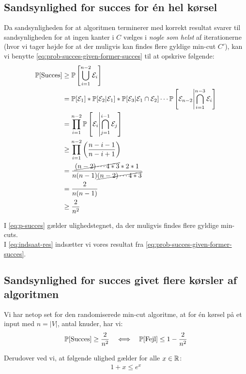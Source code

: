 \subsection{Sandsynlighed for succes for én hel kørsel}

Da sandsynligheden for at algoritmen terminerer med korrekt resultat svarer til sandsynligheden for at ingen kanter i $C$ vælges i \emph{nogle som helst} af iterationerne (hvor vi tager højde for at der muligvis kan findes flere gyldige min-cut $C'$), kan vi benytte \cref{eq:prob-succes-given-former-succes} til at opskrive følgende:
\begin{align}
    \P[\text{Succes}] &\geq \P \square{ \bigcup_{i=1}^{n-2}   \E_i} \label{eq:p-succes} \\
                      &= \P[\E_1] * \P[\E_2 | \E_1] * \P[\E_3 | \E_1 \cap \E_2] \cdots \P \square{ \E_{n-2} \middle| \bigcap_{i=1}^{n-3} \E_i } \nonumber \\
                      &= \prod_{i=1}^{n-2} \P \square{ \E_i \middle| \bigcap_{j=1}^{i-1} \E_j } \nonumber \\
                      &\geq \prod_{i=1}^{n-2} \p{ \frac{n-i-1}{n-i+1} } \label{eq:indsaat-res} \\
                      &= \frac{\cancel{(n-2) \cdots 4*3}*2*1 }{n(n-1)\cancel{(n-2) \cdots 4*3} } \nonumber \\
                      &= \frac{2}{n(n-1)} \nonumber \\
                      &\geq \frac{2}{n^2} \label{eq:final-prob-min}
\end{align}

I \cref{eq:p-succes} gælder ulighedstegnet, da der muligvis findes flere gyldige min-cuts.\\
I \cref{eq:indsaat-res} indsætter vi vores resultat fra \cref{eq:prob-succes-given-former-succes}.



\subsection{Sandsynlighed for succes givet flere kørsler af algoritmen}
Vi har netop set for den randomiserede min-cut algoritme, at for én kørsel på et input med $n = |V|$, antal knuder, har vi:
$$
\P[\text{Succes}] \geq \frac{2}{n^2} \quad \Longleftrightarrow \quad \P[\text{Fejl}] \leq 1 - \frac{2}{n^2}
$$

Derudover ved vi, at følgende ulighed gælder for alle $x \in \R$:
\begin{align} \label{eq:exp-regel}
    1 + x \leq e^x
\end{align}

